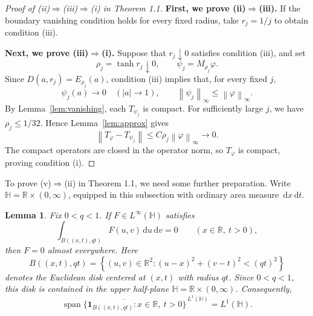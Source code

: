\documentclass[12pt,a4paper]{article}
\newtheorem{lemma}[theorem]{Lemma}
\theoremstyle{remark}
\newcommand{\dd}{\,\mathrm d}
\newcommand{\norm}[1]{\left\lVert#1\right\rVert}
\DeclareMathOperator{\Span}{span}
\begin{document}
\begin{proof}[Proof of \textnormal{(ii)}$\Rightarrow$\textnormal{(iii)}$\Rightarrow$\textnormal{(i)} in Theorem 1.1]
\textbf{First, we prove \textnormal{(ii)}$\Rightarrow$\textnormal{(iii)}.}
If the boundary vanishing condition holds for every fixed radius, take $r_j=1/j$ to obtain condition \textnormal{(iii)}.

\textbf{Next, we prove \textnormal{(iii)}$\Rightarrow$\textnormal{(i)}.}
Suppose that $r_j\downarrow0$ satisfies condition \textnormal{(iii)}, and set
\[
\rho_j=\tanh r_j\downarrow0,\qquad
\psi_j=M_{\rho_j}\varphi.
\]
Since $D(a,r_j)=E_{\rho_j}(a)$, condition \textnormal{(iii)} implies that, for every fixed $j$,
\[
\psi_j(a)\longrightarrow0\quad(|a|\to1),
\qquad \norm{\psi_j}_\infty\le\norm\varphi_\infty.
\]
By Lemma~\ref{lem:vanishing}, each $T_{\psi_j}$ is compact.
For sufficiently large $j$, we have $\rho_j\le1/32$. Hence Lemma~\ref{lem:approx} gives
\[
\norm{T_\varphi-T_{\psi_j}}\le C\rho_j\norm\varphi_\infty\longrightarrow0.
\]
The compact operators are closed in the operator norm, so $T_\varphi$ is compact, proving condition \textnormal{(i)}.
\end{proof}
To prove \textnormal{(v)}$\Rightarrow$\textnormal{(ii)} in Theorem 1.1, we need some further preparation.
Write $\mathbb H=\mathbb R\times(0,\infty)$, equipped in this subsection with ordinary area measure $\dd x\dd t$.
\begin{lemma}\label{lem:halfplane-unique}
Fix $0<q<1$. If $F\in L^\infty(\mathbb H)$ satisfies
\begin{equation}\label{eq:halfplane-zero}
\int_{B((x,t),qt)}F(u,v)\dd u\dd v=0
\qquad(x\in\mathbb R,\ t>0),
\end{equation}
then $F=0$ almost everywhere. Here
\[
B((x,t),qt)
=
\left\{(u,v)\in\mathbb{R}^2:
(u-x)^2+(v-t)^2<(qt)^2
\right\}
\]
denotes the Euclidean disk centered at $(x,t)$ with radius $qt$.
Since $0<q<1$, this disk is contained in the upper half-plane
$\mathbb H=\mathbb R\times(0,\infty)$. Consequently,
\begin{equation}\label{eq:halfplane-dense}
\overline{\Span\{\mathbf1_{B((x,t),qt)}:x\in\mathbb R,\ t>0\}}^{\,L^1(\mathbb H)}
=L^1(\mathbb H).
\end{equation}
\end{lemma}
\end{document}
